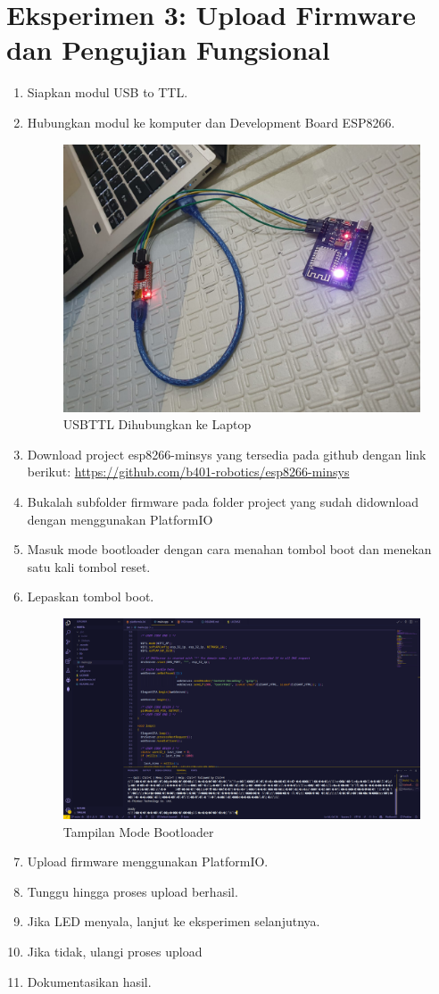 \section{Eksperimen 3: Upload Firmware dan Pengujian Fungsional}
\begin{enumerate}
    \item Siapkan modul USB to TTL.
    \item Hubungkan modul ke komputer dan Development Board ESP8266.
    \begin{figure}[H]
        \centering
        \includegraphics[width=0.4\linewidth]{P4/img/10_hubungkan_dengan_usbttl_dan_laptop.jpeg}
        \caption{USBTTL Dihubungkan ke Laptop}
        \label{fig:USBTTLLaptop}
    \end{figure}
    \item Download project esp8266-minsys yang tersedia pada github dengan link berikut: \url{https://github.com/b401-robotics/esp8266-minsys}
    \item Bukalah subfolder firmware pada folder project yang sudah didownload dengan menggunakan PlatformIO
    \item Masuk mode bootloader dengan cara menahan tombol boot dan menekan satu kali tombol reset.
    \item Lepaskan tombol boot.
    \begin{figure}[H]
        \centering
        \includegraphics[width=0.4\linewidth]{P4/img/10_tampilan_ketika_esp_masuk_bootloader.png}
        \caption{Tampilan Mode Bootloader}
        \label{fig:TampilanModeBoot}
    \end{figure}
    \item Upload firmware menggunakan PlatformIO.
    \item Tunggu hingga proses upload berhasil.
    \item Jika LED menyala, lanjut ke eksperimen selanjutnya.
    \item Jika tidak, ulangi proses upload
    \item Dokumentasikan hasil.
\end{enumerate}

